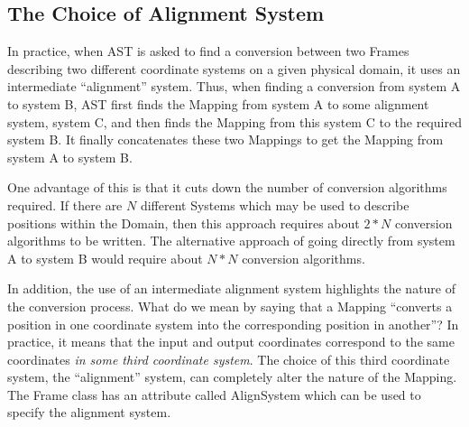 \documentclass[twoside,11pt]{article}
\newcommand{\secref}[1]{\S\ref{#1}}
\renewcommand{\secref}[1]{\ref{#1}}
\begin{document}
%
%

\subsection{\label{ss:alignmentsystem}The Choice of Alignment System}

In practice, when AST is asked to find a conversion between two Frames
describing two different coordinate systems on a given physical domain,
it uses an intermediate ``alignment'' system. Thus, when finding a
conversion from system A to system B, AST first finds the Mapping from
system A to some alignment system, system C, and then finds the Mapping
from this system C to the required system B. It finally concatenates
these two Mappings to get the Mapping from system A to system B.

One advantage of this is that it cuts down the number of conversion
algorithms required. If there are $N$ different Systems which may be used
to describe positions within the Domain, then this approach requires
about $2*N$ conversion algorithms to be written. The alternative approach
of going directly from system A to system B would require about $N*N$
conversion algorithms.

In addition, the use of an intermediate alignment system highlights the
nature of the conversion process. What do we mean by saying that a
Mapping ``converts a position in one coordinate system into the
corresponding position in another''? In practice, it means that the input
and output coordinates correspond to the same coordinates \emph{in some
third coordinate system}. The choice of this third coordinate system, the
``alignment'' system, can completely alter the nature of the Mapping. The
Frame class has an attribute called AlignSystem which can be used to
specify the alignment system.
\end{document}
